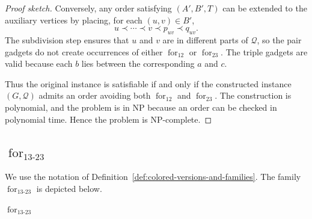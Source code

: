 \documentclass[12pt]{article}
\theoremstyle{plain}
\theoremstyle{definition}
\theoremstyle{remark}
\theoremstyle{definition}
\newcommand{\forlabel}{\mathrm{for}}
\DeclareRobustCommand{\forparam}[1]{%
  \ensuremath{\mathop{\forlabel}\nolimits_{#1}}%
}
\newcommand{\forrs}{\forparam{12}}
\newcommand{\forst}{\forparam{23}}
\begin{document}
\begin{proof}[Proof sketch]
Conversely, any order satisfying \((A',B',T)\) can be extended to the auxiliary vertices by placing, for each
\((u,v)\in B'\),
\[
u\prec \cdots \prec v \prec p_{uv}\prec q_{uv}.
\]
The subdivision step ensures that \(u\) and \(v\) are in different parts of \(\mathcal Q\), so the pair gadgets do not
create occurrences of either \(\forrs\) or \(\forst\). The triple gadgets are valid because each \(b\) lies between
the corresponding \(a\) and \(c\).

Thus the original instance is satisfiable if and only if the constructed instance \((G,\mathcal Q)\) admits an order
avoiding both \(\forrs\) and \(\forst\). The construction is polynomial, and the problem is in NP because an order can
be checked in polynomial time. Hence the problem is NP-complete.
\end{proof}












\subsection{
\texorpdfstring{\(\forparam{13\text{-}23}\)}
{for13-23}
}
\label{subsec:for13-23}

We use the notation of
Definition~\ref{def:colored-versions-and-families}.
The family \(\forparam{13\text{-}23}\) is depicted below.

\begin{center}

\smallskip
\(\forparam{13\text{-}23}\)
\end{center}
\end{document}
